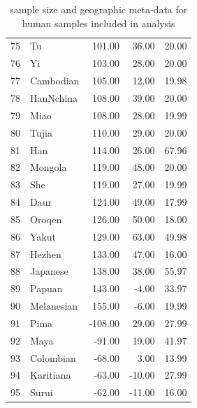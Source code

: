 \documentclass[10pt,letterpaper]{article}
\begin{document}
\begin{table}[ht]
\begin{tabular}{rlrrr}
  75 & \textcolor{Tu}{Tu} & 101.00 & 36.00 & 20.00 \\ 
  76 & \textcolor{Yi}{Yi} & 103.00 & 28.00 & 20.00 \\ 
  77 & \textcolor{Cambodian}{Cambodian} & 105.00 & 12.00 & 19.98 \\ 
  78 & \textcolor{HanNchina}{HanNchina} & 108.00 & 39.00 & 20.00 \\ 
  79 & \textcolor{Miao}{Miao} & 108.00 & 28.00 & 19.99 \\ 
  80 & \textcolor{Tujia}{Tujia} & 110.00 & 29.00 & 20.00 \\ 
  81 & \textcolor{Han}{Han} & 114.00 & 26.00 & 67.96 \\ 
  82 & \textcolor{Mongola}{Mongola} & 119.00 & 48.00 & 20.00 \\ 
  83 & \textcolor{She}{She} & 119.00 & 27.00 & 19.99 \\ 
  84 & \textcolor{Daur}{Daur} & 124.00 & 49.00 & 17.99 \\ 
  85 & \textcolor{Oroqen}{Oroqen} & 126.00 & 50.00 & 18.00 \\ 
  86 & \textcolor{Yakut}{Yakut} & 129.00 & 63.00 & 49.98 \\ 
  87 & \textcolor{Hezhen}{Hezhen} & 133.00 & 47.00 & 16.00 \\ 
  88 & \textcolor{Japanese}{Japanese} & 138.00 & 38.00 & 55.97 \\ 
  89 & \textcolor{Papuan}{Papuan} & 143.00 & -4.00 & 33.97 \\ 
  90 & \textcolor{Melanesian}{Melanesian} & 155.00 & -6.00 & 19.99 \\ 
  91 & \textcolor{Pima}{Pima} & -108.00 & 29.00 & 27.99 \\ 
  92 & \textcolor{Maya}{Maya} & -91.00 & 19.00 & 41.97 \\ 
  93 & \textcolor{Colombian}{Colombian} & -68.00 & 3.00 & 13.99 \\ 
  94 & \textcolor{Karitiana}{Karitiana} & -63.00 & -10.00 & 27.99 \\ 
  95 & \textcolor{Surui}{Surui} & -62.00 & -11.00 & 16.00 \\ 
   \hline
\end{tabular}
   \caption{sample size and geographic meta-data for human samples included in analysis}
   \label{tab:globe_data_table}
\end{table}
\end{document}
